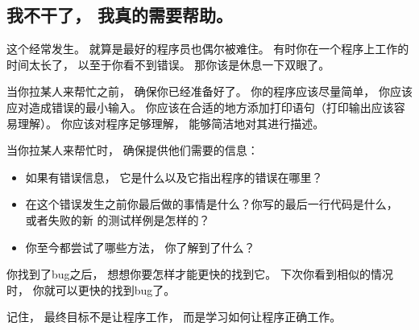 \subsection{我不干了， 我真的需要帮助。}


这个经常发生。
就算是最好的程序员也偶尔被难住。
有时你在一个程序上工作的时间太长了， 以至于你看不到错误。
那你该是休息一下双眼了。


当你拉某人来帮忙之前， 确保你已经准备好了。
你的程序应该尽量简单， 你应该应对造成错误的最小输入。
你应该在合适的地方添加打印语句（打印输出应该容易理解）。
你应该对程序足够理解， 能够简洁地对其进行描述。


当你拉某人来帮忙时， 确保提供他们需要的信息：

\begin{itemize}


\item 如果有错误信息， 它是什么以及它指出程序的错误在哪里？

\item 在这个错误发生之前你最后做的事情是什么？你写的最后一行代码是什么， 或者失败的新
   的测试样例是怎样的？

\item 你至今都尝试了哪些方法， 你了解到了什么？

\end{itemize}


你找到了bug之后， 想想你要怎样才能更快的找到它。
下次你看到相似的情况时， 你就可以更快的找到bug了。

记住， 最终目标不是让程序工作， 而是学习如何让程序正确工作。
